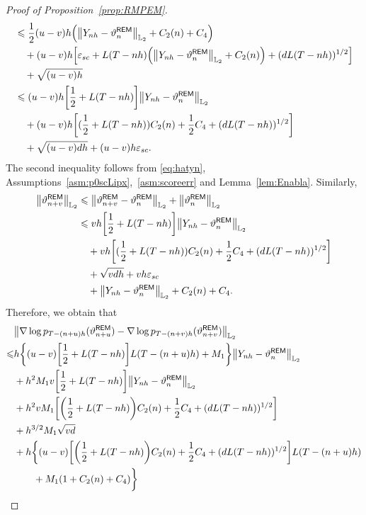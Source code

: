 \begin{proof}[Proof of Proposition~\ref{prop:RMPEM}]
\begin{align*}
    & \leqslant  \dfrac{1}{2}(u-v)h\left(\l|Y_{nh}-\vartheta_n^{\sf REM}\r|_{\Ltwo}+C_2(n)+C_4\right)\\
    &\quad  +(u-v)h\left[\varepsilon_{sc}+L(T-nh)\left(\l|Y_{nh}-\vartheta_n^{\sf REM}\r|_{\Ltwo}+C_2(n)\right)+(dL(T-nh))^{1/2}\right]\\
    &\quad +\sqrt{(u-v)h}\\
    &\leqslant  (u-v)h\left[\dfrac{1}{2}+L(T-nh)\right]\l|Y_{nh}-\vartheta_n^{\sf REM}\r|_{\Ltwo}\\
    &\quad +(u-v)h\left[(\dfrac{1}{2}+L(T-nh))C_2(n)+\dfrac{1}{2}C_4+(dL(T-nh))^{1/2}\right]\\
    &\quad +\sqrt{(u-v)dh}+(u-v)h\varepsilon_{sc}.
\end{align*}
The second inequality follows from \eqref{eq:hatyn}, Assumptions~\ref{asm:p0scLipx},~\ref{asm:scoreerr} and Lemma~\ref{lem:Enabla}. Similarly,
\begin{align*}
    \l|\vartheta_{n+v}^{\sf REM}\r|_{\Ltwo}
    &\leqslant \l|\vartheta_{n+v}^{\sf REM}-\vartheta_{n}^{\sf REM}\r|_{\Ltwo}+\l|\vartheta_n^{\sf REM}\r|_{\Ltwo}\\
    &\leqslant vh\left[\dfrac{1}{2}+L(T-nh)\right]\l|Y_{nh}-\vartheta_n^{\sf REM}\r|_{\Ltwo}\\
    &\quad +vh\left[(\dfrac{1}{2}+L(T-nh))C_2(n)+\dfrac{1}{2}C_4+(dL(T-nh))^{1/2}\right]\\
    &\quad +\sqrt{vdh}+vh\varepsilon_{sc}\\
    &\quad +\l|Y_{nh}-\vartheta_n^{\sf REM}\r|_{\Ltwo}+C_2(n)+C_4.
\end{align*}
Therefore, we obtain that
\begin{align*}
    &\left\lVert \nabla\log p_{T-(n+u)h}(\vartheta_{n+u}^{\sf REM})-\nabla\log p_{T-(n+v)h}(\vartheta_{n+v}^{\sf REM})\right\rVert_{\Ltwo}\\
    \leqslant & h\bigg\{(u-v)\left[\dfrac{1}{2}+L(T-nh)\right]L(T-(n+u)h)+M_1\bigg\}\l|Y_{nh}-\vartheta_n^{\sf REM}\r|_{\Ltwo}\\
    &+h^2M_1v\left[\dfrac{1}{2}+L(T-nh)\right]\l|Y_{nh}-\vartheta_n^{\sf REM}\r|_{\Ltwo}\\
    &+h^2vM_1\left[\left(\dfrac{1}{2}+L(T-nh)\right)C_2(n)+\dfrac{1}{2}C_4+(dL(T-nh))^{1/2}\right]\\
    &+h^{3/2}M_1\sqrt{vd}\\
    &+h\bigg\{(u-v)\left[\left(\dfrac{1}{2}+L(T-nh)\right)C_2(n)+\dfrac{1}{2}C_4+(dL(T-nh))^{1/2}\right]L(T-(n+u)h)\\
    &\qquad+M_1(1+C_2(n)+C_4)\bigg\}\\

\end{align*}
\end{proof}

